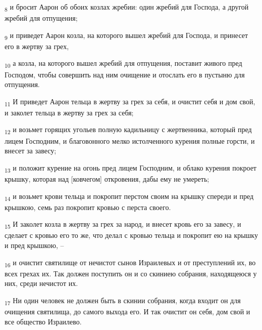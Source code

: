 \begin{tcolorbox}
\textsubscript{8} и бросит Аарон об обоих козлах жребии: один жребий для Господа, а другой жребий для отпущения;
\end{tcolorbox}
\begin{tcolorbox}
\textsubscript{9} и приведет Аарон козла, на которого вышел жребий для Господа, и принесет его в жертву за грех,
\end{tcolorbox}
\begin{tcolorbox}
\textsubscript{10} а козла, на которого вышел жребий для отпущения, поставит живого пред Господом, чтобы совершить над ним очищение и отослать его в пустыню для отпущения.
\end{tcolorbox}
\begin{tcolorbox}
\textsubscript{11} И приведет Аарон тельца в жертву за грех за себя, и очистит себя и дом свой, и заколет тельца в жертву за грех за себя;
\end{tcolorbox}
\begin{tcolorbox}
\textsubscript{12} и возьмет горящих угольев полную кадильницу с жертвенника, который пред лицем Господним, и благовонного мелко истолченного курения полные горсти, и внесет за завесу;
\end{tcolorbox}
\begin{tcolorbox}
\textsubscript{13} и положит курение на огонь пред лицем Господним, и облако курения покроет крышку, которая над [ковчегом] откровения, дабы ему не умереть;
\end{tcolorbox}
\begin{tcolorbox}
\textsubscript{14} и возьмет крови тельца и покропит перстом своим на крышку спереди и пред крышкою, семь раз покропит кровью с перста своего.
\end{tcolorbox}
\begin{tcolorbox}
\textsubscript{15} И заколет козла в жертву за грех за народ, и внесет кровь его за завесу, и сделает с кровью его то же, что делал с кровью тельца и покропит ею на крышку и пред крышкою, --
\end{tcolorbox}
\begin{tcolorbox}
\textsubscript{16} и очистит святилище от нечистот сынов Израилевых и от преступлений их, во всех грехах их. Так должен поступить он и со скиниею собрания, находящеюся у них, среди нечистот их.
\end{tcolorbox}
\begin{tcolorbox}
\textsubscript{17} Ни один человек не должен быть в скинии собрания, когда входит он для очищения святилища, до самого выхода его. И так очистит он себя, дом свой и все общество Израилево.
\end{tcolorbox}
